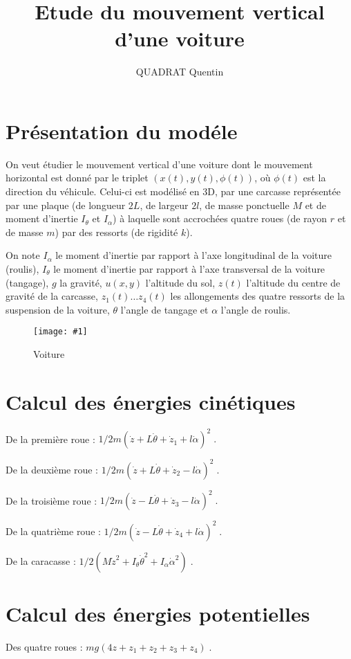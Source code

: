 \documentclass[a4paper,11pt]{amsart}
\title{Etude du mouvement vertical d'une voiture}
\author{QUADRAT Quentin}
\newcommand{\dessin}[4]{
\begin{figure}[htb]
\centering
\texttt{[image: \#1]}
\caption{#3}
\label{#4}
\end{figure}}
\begin{document}
\maketitle

\section{Pr\'esentation du mod\'ele}
On veut \'etudier le mouvement vertical d'une voiture dont le 
mouvement horizontal est donn\'e par le triplet $(x(t),y(t),\phi 
(t))$, o\`u $\phi (t)$ est la direction du v\'ehicule. Celui-ci est 
mod\'elis\'e en 3D, par une carcasse repr\'esent\'ee
par une plaque (de longueur $2L$, de largeur $2l$, de masse
ponctuelle $M$ et de moment d'inertie $I_{\theta}$ et $I_{\alpha}$)
\`a laquelle sont accroch\'ees quatre roues (de rayon
$r$ et de masse $m$) par des ressorts (de rigidit\'e $k$).

On note  $I_{\alpha}$ le moment 
d'inertie par rapport \`a l'axe longitudinal de la voiture (roulis),
$I_{\theta}$ le moment d'inertie 
par rapport \`a l'axe transversal de la voiture (tangage), $g$ la gravit\'e, 
$u(x,y)$ l'altitude du sol, $z(t)$ l'altitude du centre de gravit\'e 
de la carcasse, $z_1(t) \ldots z_4(t)$ les
allongements des quatre ressorts de la suspension de la voiture, $\theta$ 
l'angle de tangage et $\alpha$ l'angle de roulis.

\dessin{Voiture.epsf}{0.6}{Voiture}{voiture}

\section{Calcul des \'energies cin\'etiques}
De la premi\`ere roue :
$ 1/2m(\dot{z}+L\dot{\theta}+\dot{z}_1+l\dot{\alpha})^2 \;.$

De la deuxi\`eme roue :
$ 1/2m(\dot{z}+L\dot{\theta}+\dot{z}_2-l\dot{\alpha})^2 \;.$

De la troisi\`eme roue :
$ 1/2m(\dot{z}-L\dot{\theta}+\dot{z}_3-l\dot{\alpha})^2 \;.$

De la quatri\`eme roue :
$ 1/2m(\dot{z}-L\dot{\theta}+\dot{z}_4+l\dot{\alpha})^2 \;.$

De la caracasse :
$1/2(M\dot{z}^2 +I_{\theta}\dot{\theta}^2 +I_{\alpha}\dot{\alpha}^2)\;.$


\section{Calcul des \'energies potentielles}
Des quatre roues : 
$ mg(4z+z_1+z_2+z_3+z_4)\;.$
\end{document}
